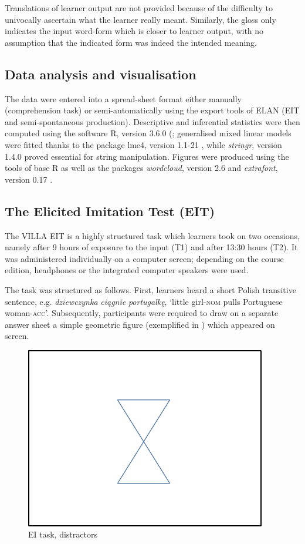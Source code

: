 Translations of learner output are not provided because of the difficulty to univocally ascertain what the learner really meant. Similarly, the gloss only indicates the input word-form which is closer to learner output, with no assumption that the indicated form was indeed the intended meaning.

\subsection{Data analysis and visualisation}\label{sec:02:4.2}

The data were entered into a spread-sheet format either manually (comprehension task) or semi-automatically using the export tools of ELAN (EIT and semi-spontaneous production). Descriptive and inferential statistics were then computed using the software R, version 3.6.0 (\citealt{RCoreTeam2017}; generalised mixed linear models were fitted thanks to the package lme4, version 1.1-21 \citep{BatesEtAl2015}, while \textit{stringr}, version 1.4.0 \citep{Wickham2017} proved essential for string manipulation. Figures were produced using the tools of base R as well as the packages \textit{wordcloud}, version 2.6 \citep{Fellows2014} and \textit{extrafont}, version 0.17 \citep{Chang2014}. 

\subsection{The Elicited Imitation Test (EIT)}\label{sec:02:4.3}

The VILLA EIT is a highly structured task which learners took on two occasions, namely after 9 hours of exposure to the input (T1) and after 13:30 hours (T2). It was administered individually on a computer screen; depending on the course edition, headphones or the integrated computer speakers were used. 

The task was structured as follows. First, learners heard a short Polish transitive sentence, e.g. \textit{dziewczynka} \textit{ciągnie} \textit{portugalkę}, ‘little girl-\textsc{nom} pulls Portuguese woman-\textsc{acc}’. Subsequently, participants were required to draw on a separate answer sheet a simple geometric figure (exemplified in ) which appeared on screen. 

\begin{figure}
    \includegraphics[height=.3\textheight]{figures/02-6.pdf}
    \caption{EI task, distractors}
    \label{fig:02:6}
\end{figure} 

